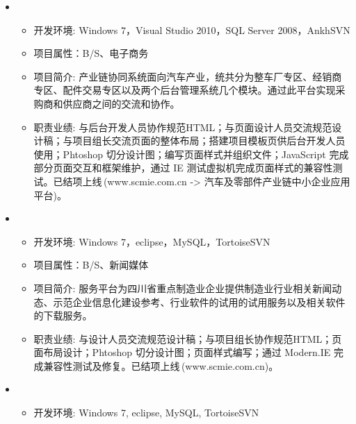   \begin{itemize}[leftmargin=*]
    \item
      {\small
      \begin{itemize}
        \item 开发环境: Windows 7，Visual Studio 2010，SQL Server 2008，AnkhSVN
        \item 项目属性：B/S、电子商务
        \item 项目简介: 产业链协同系统面向汽车产业，统共分为整车厂专区、经销商专区、配件交易专区以及两个后台管理系统几个模块。通过此平台实现采购商和供应商之间的交流和协作。
        \item 职责业绩: 与后台开发人员协作规范HTML；与页面设计人员交流规范设计稿；与项目组长交流页面的整体布局；搭建项目模板页供后台开发人员使用；Phtoshop 切分设计图；编写页面样式并组织文件；JavaScript 完成部分页面交互和框架维护，通过 IE 测试虚拟机完成页面样式的兼容性测试。已结项上线$\,$(www.scmie.com.cn -> 汽车及零部件产业链中小企业应用平台)。
      \end{itemize}
      }
    \item
      {\small
      \begin{itemize}
        \item 开发环境: Windows 7，eclipse，MySQL，TortoiseSVN
        \item 项目属性：B/S、新闻媒体
        \item 项目简介: 服务平台为四川省重点制造业企业提供制造业行业相关新闻动态、示范企业信息化建设参考、行业软件的试用的试用服务以及相关软件的下载服务。
        \item 职责业绩: 与设计人员交流规范设计稿；与项目组长协作规范HTML；页面布局设计；Phtoshop 切分设计图；页面样式编写；通过 Modern.IE 完成兼容性测试及修复。已结项上线$\,$(www.scmie.com.cn)。
      \end{itemize}
      }
    \item
    {\small
    \begin{itemize}
      \item 开发环境: Windows 7, eclipse, MySQL, TortoiseSVN

\end{itemize}}
\end{itemize}
